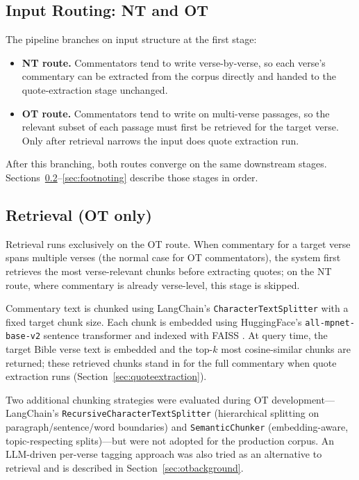 \subsection{Input Routing: NT and OT}
\label{sec:inputrouting}

The pipeline branches on input structure at the first stage:

\begin{itemize}[nosep,leftmargin=*]
    \item \textbf{NT route.} Commentators tend to write verse-by-verse, so each verse's commentary can be extracted from the corpus directly and handed to the quote-extraction stage unchanged.
    \item \textbf{OT route.} Commentators tend to write on multi-verse passages, so the relevant subset of each passage must first be retrieved for the target verse. Only after retrieval narrows the input does quote extraction run.
\end{itemize}

\noindent After this branching, both routes converge on the same downstream stages. Sections~\ref{sec:retrieval}--\ref{sec:footnoting} describe those stages in order.

\subsection{Retrieval (OT only)}
\label{sec:retrieval}

Retrieval runs exclusively on the OT route. When commentary for a target verse spans multiple verses (the normal case for OT commentators), the system first retrieves the most verse-relevant chunks before extracting quotes; on the NT route, where commentary is already verse-level, this stage is skipped.

Commentary text is chunked using LangChain's \texttt{CharacterTextSplitter} \citep{chase2022langchain} with a fixed target chunk size. Each chunk is embedded using HuggingFace's \texttt{all-mpnet-base-v2} sentence transformer \citep{song2020mpnet} and indexed with FAISS \citep{johnson2019faiss}. At query time, the target Bible verse text is embedded and the top-$k$ most cosine-similar chunks are returned; these retrieved chunks stand in for the full commentary when quote extraction runs (Section~\ref{sec:quoteextraction}).

Two additional chunking strategies were evaluated during OT development---LangChain's \texttt{RecursiveCharacterTextSplitter} (hierarchical splitting on paragraph/sentence/word boundaries) and \texttt{SemanticChunker} (embedding-aware, topic-respecting splits)---but were not adopted for the production corpus. An LLM-driven per-verse tagging approach was also tried as an alternative to retrieval and is described in Section~\ref{sec:otbackground}.

